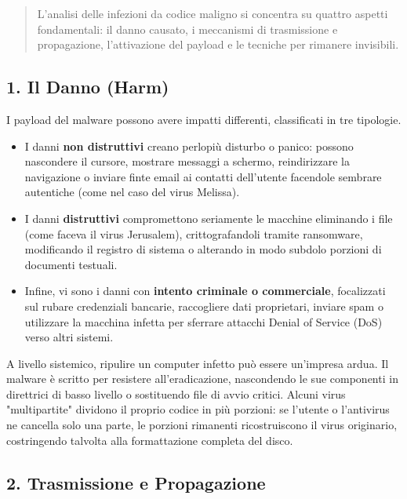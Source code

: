 \documentclass{article}
\begin{document}
\begin{quote}
    L'analisi delle infezioni da codice maligno si concentra su quattro aspetti fondamentali: il danno causato, i meccanismi di trasmissione e propagazione, l'attivazione del payload e le tecniche per rimanere invisibili.
\end{quote}

\subsection*{1. Il Danno (Harm)}

I payload del malware possono avere impatti differenti, classificati in tre tipologie.

\begin{itemize}
    \item I danni \textbf{non distruttivi} creano perlopiù disturbo o panico: possono nascondere il cursore, mostrare messaggi a schermo, reindirizzare la navigazione o inviare finte email ai contatti dell'utente facendole sembrare autentiche (come nel caso del virus Melissa).
    \item I danni \textbf{distruttivi} compromettono seriamente le macchine eliminando i file (come faceva il virus Jerusalem), crittografandoli tramite ransomware, modificando il registro di sistema o alterando in modo subdolo porzioni di documenti testuali.
    \item Infine, vi sono i danni con \textbf{intento criminale o commerciale}, focalizzati sul rubare credenziali bancarie, raccogliere dati proprietari, inviare spam o utilizzare la macchina infetta per sferrare attacchi Denial of Service (DoS) verso altri sistemi.
\end{itemize}

A livello sistemico, ripulire un computer infetto può essere un'impresa ardua. Il malware è scritto per resistere all'eradicazione, nascondendo le sue componenti in direttrici di basso livello o sostituendo file di avvio critici. Alcuni virus "multipartite" dividono il proprio codice in più porzioni: se l'utente o l'antivirus ne cancella solo una parte, le porzioni rimanenti ricostruiscono il virus originario, costringendo talvolta alla formattazione completa del disco.

\vspace{0.8cm}

\subsection*{2. Trasmissione e Propagazione}
\end{document}
